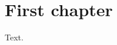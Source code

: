 \documentclass{closettwin}
\begin{document}
\frontmatter
\ctmakecover
\mainmatter
\chapter{First chapter}
Text.
\end{document}
